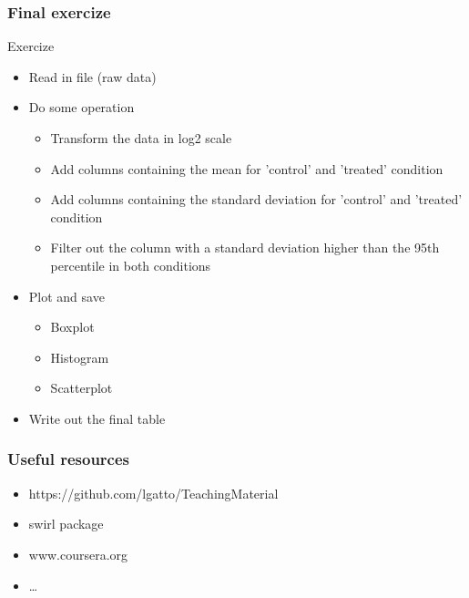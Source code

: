 \documentclass{beamer}
\begin{document}
\begin{frame}[fragile]
	\frametitle{Final exercize}
	Exercize

	\begin{itemize}
		\item Read in file (raw data)
		\item Do some operation
			\begin{itemize}
				\item Transform the data in log2 scale
				\item Add columns containing the mean for 'control' and 'treated' condition 
				\item Add columns containing the standard deviation for 'control' and 'treated' condition 
				\item Filter out the column with a standard deviation higher than the 95th percentile in both conditions
			\end{itemize}
		\item Plot and save
			\begin{itemize}
				\item Boxplot
				\item Histogram
				\item Scatterplot
			\end{itemize}
		\item Write out the final table
	\end{itemize}

\end{frame}



\begin{frame}[fragile]
	\frametitle{Useful resources}
	\begin{itemize}
		\item https://github.com/lgatto/TeachingMaterial
		\item swirl package
		\item www.coursera.org
		\item \ldots
	\end{itemize}
\end{frame}
\end{document}

